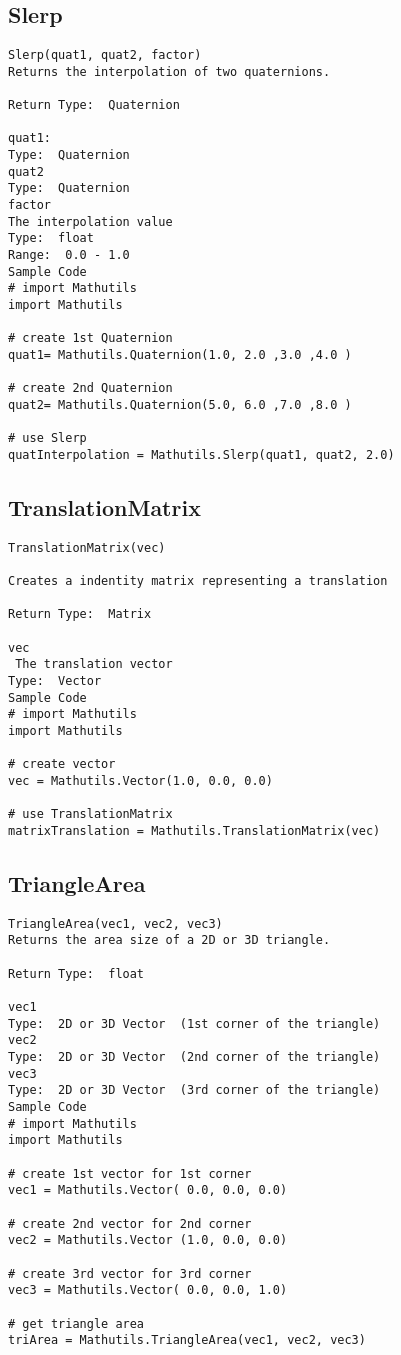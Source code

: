 \subsection{Slerp}
\begin{verbatim}
Slerp(quat1, quat2, factor)
Returns the interpolation of two quaternions.

Return Type:  Quaternion

quat1:
Type:  Quaternion 
quat2
Type:  Quaternion 
factor
The interpolation value
Type:  float 
Range:  0.0 - 1.0
Sample Code
# import Mathutils
import Mathutils

# create 1st Quaternion 
quat1= Mathutils.Quaternion(1.0, 2.0 ,3.0 ,4.0 )

# create 2nd Quaternion 
quat2= Mathutils.Quaternion(5.0, 6.0 ,7.0 ,8.0 )

# use Slerp
quatInterpolation = Mathutils.Slerp(quat1, quat2, 2.0)
\end{verbatim}

\subsection{TranslationMatrix}
\begin{verbatim}
TranslationMatrix(vec)

Creates a indentity matrix representing a translation

Return Type:  Matrix

vec
 The translation vector
Type:  Vector
Sample Code
# import Mathutils
import Mathutils

# create vector 
vec = Mathutils.Vector(1.0, 0.0, 0.0)
 
# use TranslationMatrix
matrixTranslation = Mathutils.TranslationMatrix(vec)
\end{verbatim}


\subsection{TriangleArea}
\begin{verbatim}
TriangleArea(vec1, vec2, vec3)
Returns the area size of a 2D or 3D triangle.

Return Type:  float

vec1
Type:  2D or 3D Vector  (1st corner of the triangle)
vec2
Type:  2D or 3D Vector  (2nd corner of the triangle)
vec3
Type:  2D or 3D Vector  (3rd corner of the triangle)
Sample Code
# import Mathutils
import Mathutils

# create 1st vector for 1st corner
vec1 = Mathutils.Vector( 0.0, 0.0, 0.0)

# create 2nd vector for 2nd corner
vec2 = Mathutils.Vector (1.0, 0.0, 0.0)

# create 3rd vector for 3rd corner
vec3 = Mathutils.Vector( 0.0, 0.0, 1.0)

# get triangle area
triArea = Mathutils.TriangleArea(vec1, vec2, vec3)
\end{verbatim}


